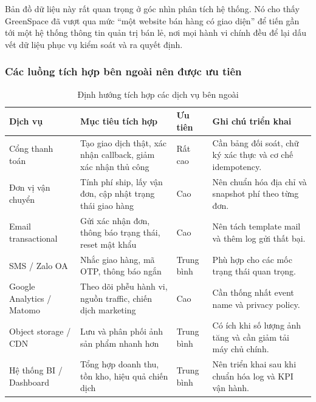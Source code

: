 \documentclass[11pt, a4paper]{article}
\begin{document}
Bản đồ dữ liệu này rất quan trọng ở góc nhìn phân tích hệ thống. Nó cho thấy GreenSpace
đã vượt qua mức ``một website bán hàng có giao diện'' để tiến gần tới một hệ thống thông tin
quản trị bán lẻ, nơi mọi hành vi chính đều để lại dấu vết dữ liệu phục vụ kiểm soát và ra quyết định.

\subsubsection{Các luồng tích hợp bên ngoài nên được ưu tiên}

\begin{table}[H]
    \centering
    \caption{Định hướng tích hợp các dịch vụ bên ngoài}
    \label{tab:integration-plan}
    \begin{tabularx}{\linewidth}{|>{\raggedright\arraybackslash}p{3.2cm}
                                  |>{\raggedright\arraybackslash}p{3.8cm}
                                  |>{\centering\arraybackslash}p{2cm}
                                  |Y|}
        \hline
        \textbf{Dịch vụ} & \textbf{Mục tiêu tích hợp} & \textbf{Ưu tiên} & \textbf{Ghi chú triển khai} \\ \hline
        Cổng thanh toán & Tạo giao dịch thật, xác nhận callback, giảm xác nhận thủ công & Rất cao & Cần bảng đối soát, chữ ký xác thực và cơ chế idempotency. \\ \hline
        Đơn vị vận chuyển & Tính phí ship, lấy vận đơn, cập nhật trạng thái giao hàng & Cao & Nên chuẩn hóa địa chỉ và snapshot phí theo từng đơn. \\ \hline
        Email transactional & Gửi xác nhận đơn, thông báo trạng thái, reset mật khẩu & Cao & Nên tách template mail và thêm log gửi thất bại. \\ \hline
        SMS / Zalo OA & Nhắc giao hàng, mã OTP, thông báo ngắn & Trung bình & Phù hợp cho các mốc trạng thái quan trọng. \\ \hline
        Google Analytics / Matomo & Theo dõi phễu hành vi, nguồn traffic, chiến dịch marketing & Cao & Cần thống nhất event name và privacy policy. \\ \hline
        Object storage / CDN & Lưu và phân phối ảnh sản phẩm nhanh hơn & Trung bình & Có ích khi số lượng ảnh tăng và cần giảm tải máy chủ chính. \\ \hline
        Hệ thống BI / Dashboard & Tổng hợp doanh thu, tồn kho, hiệu quả chiến dịch & Trung bình & Nên triển khai sau khi chuẩn hóa log và KPI vận hành. \\ \hline
    \end{tabularx}
\end{table}
\end{document}
